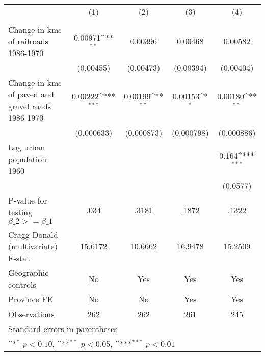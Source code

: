 {
\def\sym#1{\ifmmode^{#1}\else\(^{#1}\)\fi}
\begin{tabular}{l*{4}{c}}
\hline\hline
                &\multicolumn{1}{c}{(1)}&\multicolumn{1}{c}{(2)}&\multicolumn{1}{c}{(3)}&\multicolumn{1}{c}{(4)}\\
                &\multicolumn{1}{c}{}&\multicolumn{1}{c}{}&\multicolumn{1}{c}{}&\multicolumn{1}{c}{}\\
\hline
Change in kms of railroads 1986-1970&  0.00971\sym{**} &  0.00396         &  0.00468         &  0.00582         \\
                &(0.00455)         &(0.00473)         &(0.00394)         &(0.00404)         \\
[1em]
Change in kms of paved and gravel roads 1986-1970&  0.00222\sym{***}&  0.00199\sym{**} &  0.00153\sym{*}  &  0.00180\sym{**} \\
                &(0.000633)         &(0.000873)         &(0.000798)         &(0.000886)         \\
[1em]
Log urban population 1960&                  &                  &                  &    0.164\sym{***}\\
                &                  &                  &                  & (0.0577)         \\
\hline
P-value for testing $\beta\_{2} >= \beta\_{1}$&     .034         &    .3181         &    .1872         &    .1322         \\
Cragg-Donald (multivariate) F-stat&  15.6172         &  10.6662         &  16.9478         &  15.2509         \\
Geographic controls&       No         &      Yes         &      Yes         &      Yes         \\
Province FE     &       No         &       No         &      Yes         &      Yes         \\
Observations    &      262         &      262         &      261         &      245         \\
\hline\hline
\multicolumn{5}{l}{\footnotesize Standard errors in parentheses}\\
\multicolumn{5}{l}{\footnotesize \sym{*} \(p<0.10\), \sym{**} \(p<0.05\), \sym{***} \(p<0.01\)}\\
\end{tabular}
}
